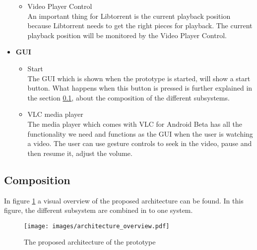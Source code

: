 \begin{itemize}
\begin{itemize}
		\item Video Player Control\\
An important thing for Libtorrent is the current playback position because Libtorrent needs to get the right pieces for playback. The current playback position will be monitored by the Video Player Control.
	\end{itemize}
\item \textbf{GUI}
	\begin{itemize}
		\item Start\\
The GUI which is shown when the prototype is started, will show a start button. What happens when this button is pressed is further explained in the section \ref{sec:comp}, about the composition of the different subsystems.
		\item VLC media player\\
The media player which comes with VLC for Android Beta has all the functionality we need and functions as the GUI when the user is watching a video. The user can use gesture controls to seek in the video, pause and then resume it, adjust the volume.
	\end{itemize}
\end{itemize}
\subsection{Composition}
\label{sec:comp}
In figure \ref{fig:prop_arch} a visual overview of the proposed architecture can be found. In this figure, the different subsystem are combined in to one system.
\begin{figure}[h]
	\texttt{[image: images/architecture\_overview.pdf]}
	\caption{The proposed architecture of the prototype}
	\label{fig:prop_arch}
\end{figure}